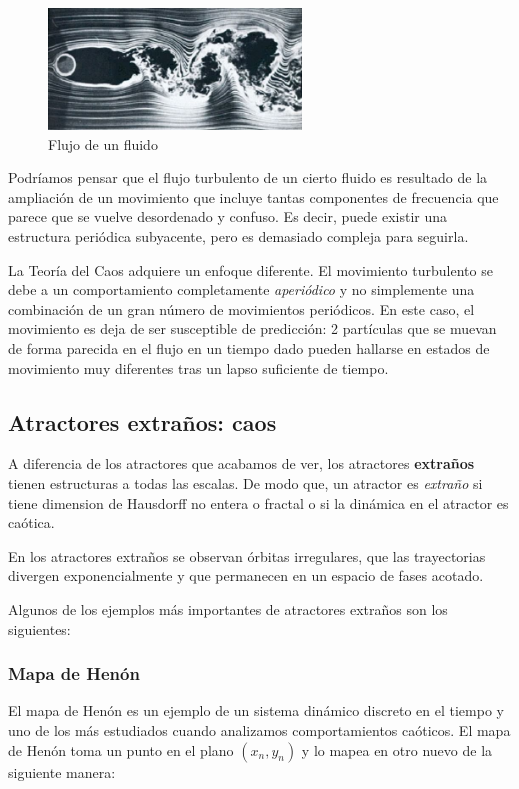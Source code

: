 \begin{figure}[hbtp]
\centering
\includegraphics[width = 0.6\textwidth]{img/flujo_turb.jpg}
\caption{Flujo de un fluido}
\label{fig:flujo_turb}
\end{figure}


Podríamos pensar que el flujo turbulento de un cierto fluido es resultado de la ampliación de un movimiento que incluye tantas componentes de frecuencia que parece que se vuelve desordenado y confuso. Es decir, puede existir una estructura periódica subyacente, pero es demasiado compleja para seguirla.

La Teoría del Caos adquiere un enfoque diferente. El movimiento turbulento se debe a un comportamiento completamente \emph{aperiódico} y no simplemente una combinación de un gran número de movimientos periódicos. En este caso, el movimiento es  deja de ser susceptible de predicción: 2 partículas que se muevan de forma parecida en el flujo en un tiempo dado pueden hallarse en estados de movimiento muy diferentes tras un lapso suficiente de tiempo.


\subsection{Atractores extraños: caos}

\begin{definition}
A diferencia de los atractores que acabamos de ver, los atractores \textbf{extraños} tienen estructuras a todas las escalas. De modo que, un atractor es \emph{extraño} si tiene dimension de Hausdorff no entera o fractal o si la dinámica en el atractor es caótica.
\end{definition}
En los atractores extraños se observan órbitas irregulares, que las trayectorias divergen exponencialmente y que permanecen en un espacio de fases acotado.


Algunos de los ejemplos más importantes de atractores extraños son los siguientes:

\subsubsection{Mapa de Henón}
El mapa de Henón es un ejemplo de un sistema dinámico discreto en el tiempo y uno de los más estudiados cuando analizamos comportamientos caóticos. El mapa de Henón toma un punto en el plano $(x_n,y_n)$ y lo mapea en otro nuevo de la siguiente manera:\newline

